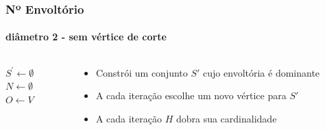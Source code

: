\begin{frame}
\frametitle{Nº Envoltório}
\framesubtitle{diâmetro 2 - sem vértice de corte}
  \begin{columns}[T]
    \begin{column}{.5\textwidth}
    \begin{algorithm}[H]
    \SetAlFnt{\tiny}
    \SetAlCapFnt{\small}
    \SetAlCapNameFnt{\small}
    \SetAlgoLined
    \DontPrintSemicolon
    \LinesNumbered
    \SetAlgoLined
    \BlankLine
    \BlankLine

    $S^\prime \gets \emptyset$ \\
    $N \gets \emptyset$ \\
    $O \gets V$ \\
    \caption{$ConjuntoFechoDominante(G(V,E))$}
    \end{algorithm}
    \end{column}
    \begin{column}{.5\textwidth}
        \begin{itemize}
            \item{Constrói um conjunto $S\prime$ cujo envoltória é dominante}
            \item{A cada iteração escolhe um novo vértice para $S\prime$}
            \item{A cada iteração $H$ dobra sua cardinalidade}
        \end{itemize}
     \end{column}
  \end{columns}
\end{frame}

